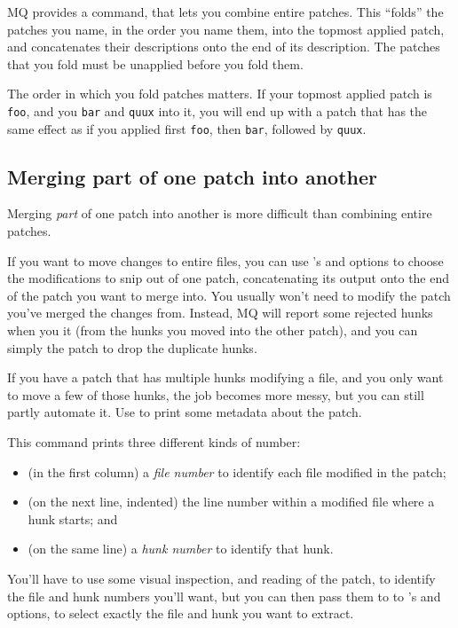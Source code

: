MQ provides a command,  that lets you combine entire
patches.  This ``folds'' the patches you name, in the order you name
them, into the topmost applied patch, and concatenates their
descriptions onto the end of its description.  The patches that you
fold must be unapplied before you fold them.

The order in which you fold patches matters.  If your topmost applied
patch is \texttt{foo}, and you  \texttt{bar} and
\texttt{quux} into it, you will end up with a patch that has the same
effect as if you applied first \texttt{foo}, then \texttt{bar},
followed by \texttt{quux}.

\subsection{Merging part of one patch into another}

Merging \emph{part} of one patch into another is more difficult than
combining entire patches.

If you want to move changes to entire files, you can use
's  and
 options to choose the modifications to snip
out of one patch, concatenating its output onto the end of the patch
you want to merge into.  You usually won't need to modify the patch
you've merged the changes from.  Instead, MQ will report some rejected
hunks when you  it (from the hunks you moved into the
other patch), and you can simply  the patch to drop
the duplicate hunks.

If you have a patch that has multiple hunks modifying a file, and you
only want to move a few of those hunks, the job becomes more messy,
but you can still partly automate it.  Use  to
print some metadata about the patch.

This command prints three different kinds of number:
\begin{itemize}
\item (in the first column) a \emph{file number} to identify each file
  modified in the patch;
\item (on the next line, indented) the line number within a modified
  file where a hunk starts; and
\item (on the same line) a \emph{hunk number} to identify that hunk.
\end{itemize}

You'll have to use some visual inspection, and reading of the patch,
to identify the file and hunk numbers you'll want, but you can then
pass them to to 's 
and  options, to select exactly the file
and hunk you want to extract.

